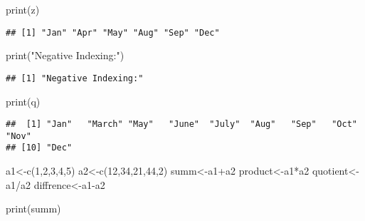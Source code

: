 \documentclass[
]{article}
\newenvironment{Shaded}{\begin{snugshade}}{\end{snugshade}}
\newcommand{\DecValTok}[1]{\textcolor[rgb]{0.00,0.00,0.81}{#1}}
\newcommand{\FunctionTok}[1]{\textcolor[rgb]{0.00,0.00,0.00}{#1}}
\newcommand{\NormalTok}[1]{#1}
\newcommand{\OtherTok}[1]{\textcolor[rgb]{0.56,0.35,0.01}{#1}}
\newcommand{\SpecialCharTok}[1]{\textcolor[rgb]{0.00,0.00,0.00}{#1}}
\newcommand{\StringTok}[1]{\textcolor[rgb]{0.31,0.60,0.02}{#1}}
\begin{document}
\begin{Shaded}
\begin{Highlighting}[]
\FunctionTok{print}\NormalTok{(z)}
\end{Highlighting}
\end{Shaded}

\begin{verbatim}
## [1] "Jan" "Apr" "May" "Aug" "Sep" "Dec"
\end{verbatim}

\begin{Shaded}
\begin{Highlighting}[]
\FunctionTok{print}\NormalTok{(}\StringTok{"Negative Indexing:"}\NormalTok{)}
\end{Highlighting}
\end{Shaded}

\begin{verbatim}
## [1] "Negative Indexing:"
\end{verbatim}

\begin{Shaded}
\begin{Highlighting}[]
\FunctionTok{print}\NormalTok{(q)}
\end{Highlighting}
\end{Shaded}

\begin{verbatim}
##  [1] "Jan"   "March" "May"   "June"  "July"  "Aug"   "Sep"   "Oct"   "Nov"  
## [10] "Dec"
\end{verbatim}

\begin{Shaded}
\begin{Highlighting}[]
\NormalTok{a1}\OtherTok{\textless{}{-}}\FunctionTok{c}\NormalTok{(}\DecValTok{1}\NormalTok{,}\DecValTok{2}\NormalTok{,}\DecValTok{3}\NormalTok{,}\DecValTok{4}\NormalTok{,}\DecValTok{5}\NormalTok{)}
\NormalTok{a2}\OtherTok{\textless{}{-}}\FunctionTok{c}\NormalTok{(}\DecValTok{12}\NormalTok{,}\DecValTok{34}\NormalTok{,}\DecValTok{21}\NormalTok{,}\DecValTok{44}\NormalTok{,}\DecValTok{2}\NormalTok{)}
\NormalTok{summ}\OtherTok{\textless{}{-}}\NormalTok{a1}\SpecialCharTok{+}\NormalTok{a2}
\NormalTok{product}\OtherTok{\textless{}{-}}\NormalTok{a1}\SpecialCharTok{*}\NormalTok{a2}
\NormalTok{quotient}\OtherTok{\textless{}{-}}\NormalTok{a1}\SpecialCharTok{/}\NormalTok{a2}
\NormalTok{diffrence}\OtherTok{\textless{}{-}}\NormalTok{a1}\SpecialCharTok{{-}}\NormalTok{a2}

\FunctionTok{print}\NormalTok{(summ)}
\end{Highlighting}
\end{Shaded}
\end{document}

